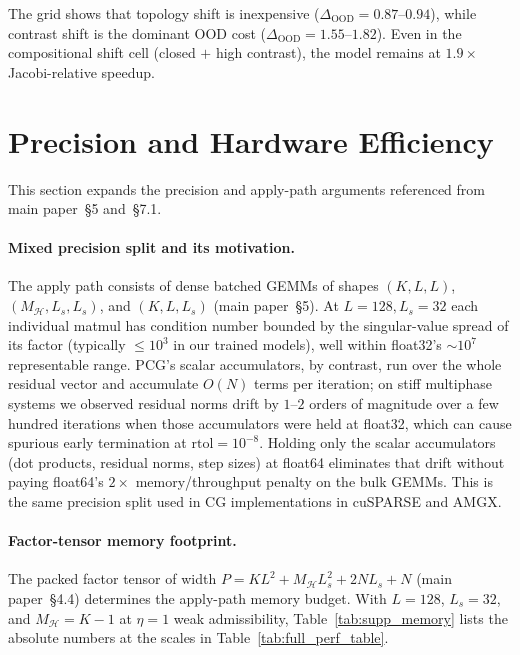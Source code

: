 \documentclass[acmtog,anonymous,review]{acmart}
\begin{document}
The grid shows that topology shift is inexpensive
($\Delta_{\text{OOD}}\!=\!0.87$--$0.94$), while contrast shift is the dominant
OOD cost ($\Delta_{\text{OOD}}\!=\!1.55$--$1.82$). Even in the compositional
shift cell (closed $+$ high contrast), the model remains at $1.9\times$
Jacobi-relative speedup.

\section{Precision and Hardware Efficiency}
\label{supp:precision}

This section expands the precision and apply-path arguments referenced from main
paper~\S5 and~\S7.1.

\paragraph{Mixed precision split and its motivation.}
The apply path consists of dense batched GEMMs of shapes $(K, L, L)$,
$(M_{\mathcal{H}}, L_s, L_s)$, and $(K, L, L_s)$ (main paper~\S5). At
$L\!=\!128, L_s\!=\!32$ each individual matmul has condition number bounded by
the singular-value spread of its factor (typically $\le\!10^3$ in our trained
models), well within float32's $\sim\!10^7$ representable range. PCG's scalar
accumulators, by contrast, run over the whole residual vector and accumulate
$O(N)$ terms per iteration; on stiff multiphase systems we observed residual
norms drift by $1$--$2$ orders of magnitude over a few hundred iterations when
those accumulators were held at float32, which can cause spurious early
termination at $\mathrm{rtol}\!=\!10^{-8}$. Holding only the scalar
accumulators (dot products, residual norms, step sizes) at float64 eliminates
that drift without paying float64's $2\!\times$ memory/throughput penalty on
the bulk GEMMs. This is the same precision split used in CG implementations in
cuSPARSE and AMGX.

\paragraph{Factor-tensor memory footprint.}
The packed factor tensor of width $P\!=\!KL^2 + M_{\mathcal{H}} L_s^2 + 2NL_s + N$
(main paper~\S4.4) determines the apply-path memory budget. With $L\!=\!128$,
$L_s\!=\!32$, and $M_{\mathcal{H}}\!=\!K\!-\!1$ at $\eta\!=\!1$
weak admissibility, Table~\ref{tab:supp_memory} lists the absolute numbers at
the scales in Table~\ref{tab:full_perf_table}.
\end{document}
